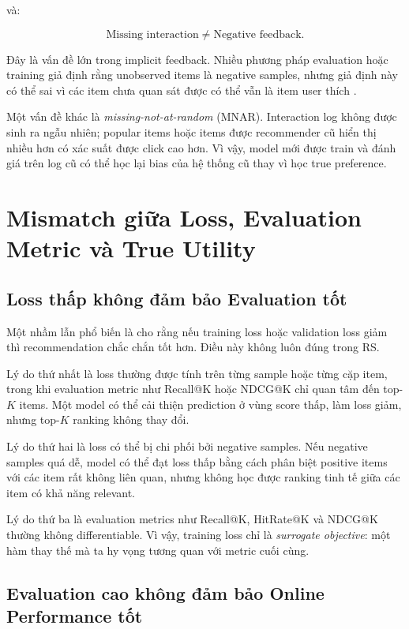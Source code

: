 \documentclass[12pt,a4paper]{article}
\begin{document}
và:

\begin{equation}
\text{Missing interaction} \neq \text{Negative feedback}.
\end{equation}

Đây là vấn đề lớn trong implicit feedback. Nhiều phương pháp evaluation hoặc training giả định rằng unobserved items là negative samples, nhưng giả định này có thể sai vì các item chưa quan sát được có thể vẫn là item user thích \cite{saito2020unbiased}.

Một vấn đề khác là \textit{missing-not-at-random} (MNAR). Interaction log không được sinh ra ngẫu nhiên; popular items hoặc items được recommender cũ hiển thị nhiều hơn có xác suất được click cao hơn. Vì vậy, model mới được train và đánh giá trên log cũ có thể học lại bias của hệ thống cũ thay vì học true preference.

\section{Mismatch giữa Loss, Evaluation Metric và True Utility}

\subsection{Loss thấp không đảm bảo Evaluation tốt}

Một nhầm lẫn phổ biến là cho rằng nếu training loss hoặc validation loss giảm thì recommendation chắc chắn tốt hơn. Điều này không luôn đúng trong RS.

Lý do thứ nhất là loss thường được tính trên từng sample hoặc từng cặp item, trong khi evaluation metric như Recall@K hoặc NDCG@K chỉ quan tâm đến top-$K$ items. Một model có thể cải thiện prediction ở vùng score thấp, làm loss giảm, nhưng top-$K$ ranking không thay đổi.

Lý do thứ hai là loss có thể bị chi phối bởi negative samples. Nếu negative samples quá dễ, model có thể đạt loss thấp bằng cách phân biệt positive items với các item rất không liên quan, nhưng không học được ranking tinh tế giữa các item có khả năng relevant.

Lý do thứ ba là evaluation metrics như Recall@K, HitRate@K và NDCG@K thường không differentiable. Vì vậy, training loss chỉ là \textit{surrogate objective}: một hàm thay thế mà ta hy vọng tương quan với metric cuối cùng.

\subsection{Evaluation cao không đảm bảo Online Performance tốt}
\end{document}
